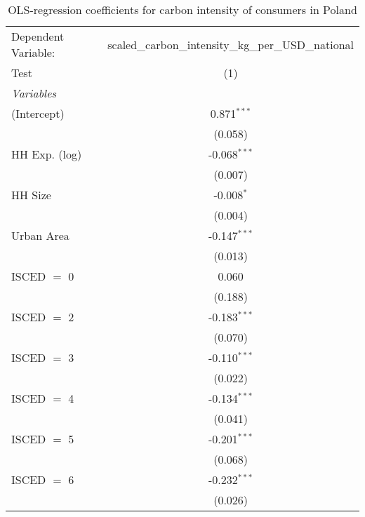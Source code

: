 
\begin{table}[htbp!]
   \centering
   \small
   \begin{adjustbox}{width = 1\textwidth, max height = 0.95\textheight, center}
      \begin{threeparttable}[b]
         \caption{\label{tab:OLS_1_POL} OLS-regression coefficients for carbon intensity of consumers in Poland}
         \begin{tabular}{lc}
            \tabularnewline \midrule \midrule
            Dependent Variable: & scaled\_carbon\_intensity\_kg\_per\_USD\_national\\        
            Test                & (1)\\  
            \midrule
            \emph{Variables}\\
            (Intercept)         & 0.871$^{***}$\\   
                                & (0.058)\\   
            HH Exp. (log)       & -0.068$^{***}$\\   
                                & (0.007)\\   
            HH Size             & -0.008$^{*}$\\   
                                & (0.004)\\   
            Urban Area          & -0.147$^{***}$\\   
                                & (0.013)\\   
            ISCED $=$ 0         & 0.060\\   
                                & (0.188)\\   
            ISCED $=$ 2         & -0.183$^{***}$\\   
                                & (0.070)\\   
            ISCED $=$ 3         & -0.110$^{***}$\\   
                                & (0.022)\\   
            ISCED $=$ 4         & -0.134$^{***}$\\   
                                & (0.041)\\   
            ISCED $=$ 5         & -0.201$^{***}$\\   
                                & (0.068)\\   
            ISCED $=$ 6         & -0.232$^{***}$\\   
                                & (0.026)\\   

\end{tabular}
\end{threeparttable}
\end{adjustbox}
\end{table}
